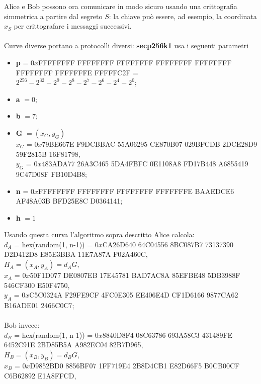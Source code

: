 \documentclass[a4paper,12pt]{tesiinfo}
\begin{document}
Alice e Bob possono ora comunicare in modo sicuro usando una crittografia simmetrica a partire dal segreto $S$: la chiave pu\`o essere, ad esempio, la coordinata $x_S$ per crittografare i messaggi successivi.
\\
\\
Curve diverse portano a protocolli diversi: \textbf{secp256k1} usa i seguenti parametri 
\begin{itemize}
    \item \textbf{p} = $0x$FFFFFFFF FFFFFFFF FFFFFFFF FFFFFFFF FFFFFFFF FFFFFFFF FFFFFFFE FFFFFC2F = $2^{256} - 2^{32}-2^9-2^8-2^7-2^6-2^4-2^0$;
    
    \item \textbf{a} $=0$;
    
    \item \textbf{b} $=7$;
    
    \item \textbf{G} $= (x_G, y_G)$
    \\
    $x_G$ = $0x$79BE667E F9DCBBAC 55A06295 CE870B07 029BFCDB 2DCE28D9 59F2815B 16F81798,
    \\
    $y_G$ = $0x$483ADA77 26A3C465 5DA4FBFC 0E1108A8 FD17B448 A6855419 9C47D08F FB10D4B8;
    
    \item \textbf{n} = $0x$FFFFFFFF FFFFFFFF FFFFFFFF FFFFFFFE BAAEDCE6 AF48A03B BFD25E8C D0364141;
    
    \item \textbf{h} $ = 1$
\end{itemize}
Usando questa curva l'algoritmo sopra descritto Alice calcola:\\
$d_A$ = hex(random(1, n-1)) = $0x$CA26D640 64C04556 8BC087B7 73137390 D2D412D8 E85E3BBA 11E7A87A F02A460C,\\
$H_A = (x_A, y_A) = d_AG$,\\
$x_A$ = $0x$50F1D077 DE0807EB 17E45781 BAD7AC8A 85EFBE48 5DB3988F 546CF300 E50F4750,\\
$y_A$ = $0x$C5C0324A F29FE9CF 4FC0E305 EE406E4D CF1D6166 9877CA62 B16ADE01 2466C0C7;\\
\\
Bob invece:\\
$d_B$ = hex(random(1, n-1)) = $0x$8840D8F4 08C63786 693A58C3 431489FE 6452C91E 2BD85B5A A982EC04 82B7D965,\\
$H_B = (x_B, y_B) = d_BG$,\\
$x_B$ = $0x$D9852BD0 8856BF07 1FF719E4 2B8D4CB1 E82D66F5 B0CB00CF C6B62892 E1A8FFCD,\\
\end{document}
